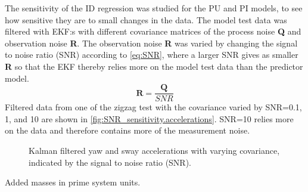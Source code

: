 The sensitivity of the ID regression was studied for the PU and PI models, to see how sensitive they are to small changes in the data.
The model test data was filtered with EKF:s with different covariance matrices of the process noise \textbf{Q} and observation noise \textbf{R}. The observation noise \textbf{R} was varied by changing the signal to noise ratio (SNR) according to \autoref{eq:SNR}, where a larger SNR gives as smaller \textbf{R} so that the EKF thereby relies more on the model test data than the predictor model.
\begin{equation}
    \label{eq:SNR}
    \mathbf{R} = \frac{\mathbf{Q}}{SNR}
\end{equation}
Filtered data from one of the zigzag test with the covariance varied by SNR=0.1, 1, and 10 are shown in \autoref{fig:SNR_sensitivity.accelerations}. SNR=10 relies more on the data and therefore contains more of the measurement noise.
\begin{figure}[h]
    \begin{center}
        
        \caption{Kalman filtered yaw and sway accelerations with varying covariance, indicated by the signal to noise ratio (SNR).}
        \label{fig:SNR_sensitivity.accelerations}
    \end{center}
\end{figure}

\begin{table}[h]
    \centering
    \caption{Added masses in prime system units.}
    \label{tab:added_masses}
\end{table}